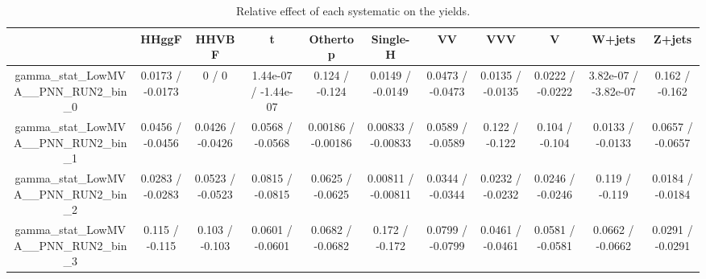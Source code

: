 \documentclass[10pt]{article}
\begin{document}
\begin{table}[htbp]
\begin{center}
\begin{tabular}{|c|c|c|c|c|c|c|c|c|c|c|}
\hline 
      & HHggF      & HHVBF      & t      & Othertop      & Single-H      & VV      & VVV      & V      & W+jets      & Z+jets \\ 
\hline 
  gamma_stat_LowMVA__PNN_RUN2_bin_0 & 0.0173 / -0.0173 & 0 / 0 & 1.44e-07 / -1.44e-07 & 0.124 / -0.124 & 0.0149 / -0.0149 & 0.0473 / -0.0473 & 0.0135 / -0.0135 & 0.0222 / -0.0222 & 3.82e-07 / -3.82e-07 & 0.162 / -0.162 \\ 
  gamma_stat_LowMVA__PNN_RUN2_bin_1 & 0.0456 / -0.0456 & 0.0426 / -0.0426 & 0.0568 / -0.0568 & 0.00186 / -0.00186 & 0.00833 / -0.00833 & 0.0589 / -0.0589 & 0.122 / -0.122 & 0.104 / -0.104 & 0.0133 / -0.0133 & 0.0657 / -0.0657 \\ 
  gamma_stat_LowMVA__PNN_RUN2_bin_2 & 0.0283 / -0.0283 & 0.0523 / -0.0523 & 0.0815 / -0.0815 & 0.0625 / -0.0625 & 0.00811 / -0.00811 & 0.0344 / -0.0344 & 0.0232 / -0.0232 & 0.0246 / -0.0246 & 0.119 / -0.119 & 0.0184 / -0.0184 \\ 
  gamma_stat_LowMVA__PNN_RUN2_bin_3 & 0.115 / -0.115 & 0.103 / -0.103 & 0.0601 / -0.0601 & 0.0682 / -0.0682 & 0.172 / -0.172 & 0.0799 / -0.0799 & 0.0461 / -0.0461 & 0.0581 / -0.0581 & 0.0662 / -0.0662 & 0.0291 / -0.0291 \\ 
\hline 
\end{tabular} 
\caption{Relative effect of each systematic on the yields.} 
\end{center} 
\end{table} 
\end{document}
